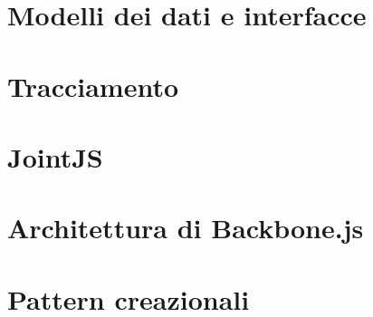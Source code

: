 \section{Modelli dei dati e interfacce}


\section{Tracciamento}




\appendix

\section{JointJS} \label{sec:app_jointjs}


\section{Architettura di Backbone.js}


\section{Pattern creazionali}



